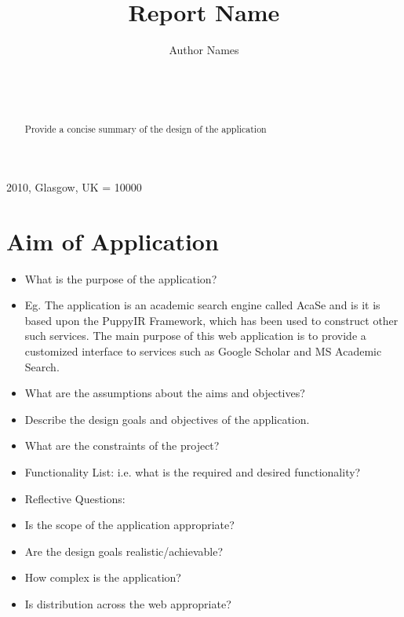 \documentclass{sig-alt-release2}
\begin{document}
\newcommand{\todo}[1]{\textcolor{red}{#1}}
\def\newblock{\hskip .11em plus .33em minus .07em}

 {2010, Glasgow, UK} 
\widowpenalty = 10000

\title{{Report Name}}

\author{
\alignauthor
Author Names\\
	   \\
      \\
      \\
}
\maketitle

\begin{abstract}
Provide a concise summary of the design of the application

\end{abstract}

\section{Aim of Application}
\begin{itemize}
\item	What is the purpose of the application?
\item	Eg. The application is an academic search engine called AcaSe and is it is based upon the PuppyIR Framework\cite{glassey2011framework}, which has been used to construct other such services\cite{glassey2010fifi,elliot2010fifi}. The main purpose of this web application is to provide a customized interface to services such as Google Scholar and MS Academic Search. 
\item	What are the assumptions about the aims and objectives?
\item	Describe the design goals and objectives of the application.
\item	What are the constraints of the project?
\item	Functionality List: i.e. what is the required and desired functionality?
\item	Reflective Questions: 
\item	Is the scope of the application appropriate? 
\item	Are the design goals realistic/achievable? 
\item	How complex is the application? 
\item	Is distribution across the web appropriate? 
\end{itemize}
\end{document}
